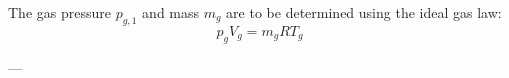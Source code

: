 The gas pressure \( p_{g,1} \) and mass \( m_g \) are to be determined using the ideal gas law:  
\[
p_g V_g = m_g R T_g
\]

---
